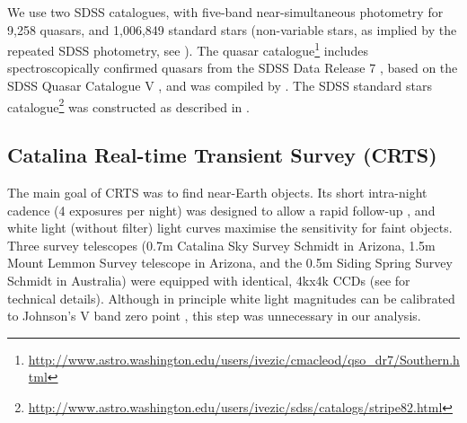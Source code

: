 \documentclass[fleqn,usenatbib]{mnras}
\begin{document}
We use two SDSS catalogues, with five-band near-simultaneous photometry for 9,258  quasars,  and 1,006,849 standard stars
(non-variable stars, as implied by the repeated SDSS photometry, see \citealt{ivezic2007}). 
The quasar catalogue\footnote{\url{http://www.astro.washington.edu/users/ivezic/cmacleod/qso_dr7/Southern.html}} includes spectroscopically confirmed quasars from the SDSS Data Release 7 \citep{abazajian2009}, based on the SDSS Quasar Catalogue V \citep{schneider2010}, and was compiled by \cite{macleod2012}. The SDSS standard stars
catalogue\footnote{\url{http://www.astro.washington.edu/users/ivezic/sdss/catalogs/stripe82.html}} 
was constructed as described in \cite{ivezic2007}.


\subsection{Catalina Real-time Transient Survey (CRTS) \label{sec:crtsdata}}
The main goal of CRTS was to find near-Earth objects. Its short intra-night cadence (4 exposures per
night) was designed to allow a rapid follow-up \citep{graham2015b}, and white light (without filter) 
light curves maximise the sensitivity for faint objects. Three survey telescopes (0.7m Catalina Sky Survey 
Schmidt in Arizona,  1.5m Mount  Lemmon Survey telescope in Arizona, and the 0.5m Siding Spring Survey 
Schmidt in Australia) were equipped with identical, 4kx4k CCDs (see \cite{djorgovski2011a} for technical details).
Although in principle white light magnitudes can be calibrated to Johnson's V band zero point \citep{drake2013},
this step was unnecessary in our analysis. 
\end{document}
